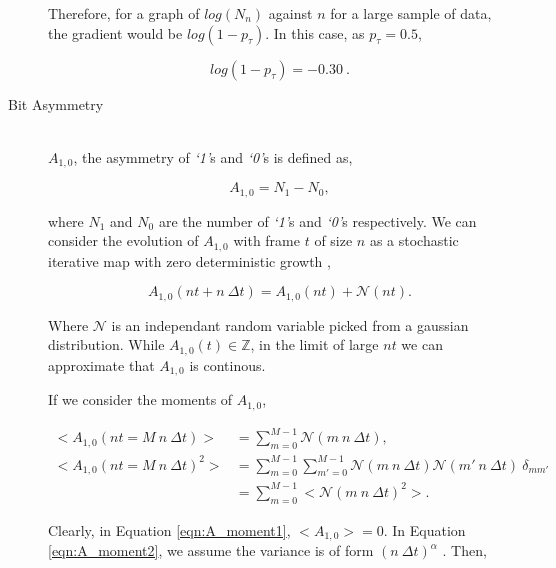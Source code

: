 \begin{description}
					Therefore, for a graph of $log(N_n)$ against $n$ for a large sample of data, the gradient would be $log(1 - p_\tau)$.
					In this case, as $p_\tau = 0.5$, 

					\begin{equation}
						log(1 - p_\tau) = -0.30\ .
						\label{eqn:log_chain_length_gradient}			
					\end{equation}

				\item[Bit Asymmetry] \hfill \\
					
					$A_{1,0}$, the asymmetry of \textit{`1'}s and \textit{`0'}s is defined as,

					\begin{equation}
						A_{1,0} = N_1 - N_0,
						\label{eqn:a_def}
					\end{equation}

					where $N_1$ and $N_0$ are the number of \textit{`1'}s and \textit{`0'}s respectively.
					We can consider the evolution of $A_{1,0}$ with frame $t$ of size $n$ as a stochastic iterative map with zero deterministic growth \cite{ref:stockastic_physics},

					\begin{equation}
						A_{1,0}(nt + n\ \Delta t) = A_{1,0}(nt) + \mathcal{N}(nt).
					\end{equation}

					Where $\mathcal{N}$ is an independant random variable picked from a gaussian distribution. While $A_{1,0}(t) \in \mathbb{Z}$, in the limit of large $nt$ we can approximate that $A_{1,0}$ is continous. 
					\par
					If we consider the moments of $A_{1,0}$,

					\begin{align}
						\label{eqn:A_moment1}
						<A_{1,0}(nt = M\ n\ \Delta t)> & = \sum_{m = 0}^{M -1}  \mathcal{N}(m\ n\ \Delta t), \\
						\label{eqn:A_moment2}
						<A_{1,0}(nt = M\ n\ \Delta t)^2> & = \sum_{m=0}^{M-1} \sum_{m'=0}^{M-1}  \mathcal{N}(m\ n\ \Delta t) \mathcal{N}(m'\ n\ \Delta t)\ \delta_{mm'} \nonumber \\
						&= \sum_{m=0}^{M-1} < \mathcal{N}(m\ n\ \Delta t)^2 >.
					\end{align}

					Clearly, in Equation \ref{eqn:A_moment1}, $<A_{1,0}> = 0$. In Equation \ref{eqn:A_moment2}, we assume the variance is of form $(n\ \Delta t)^\alpha$ \cite{ref:stockastic_physics}. Then,


\end{description}
